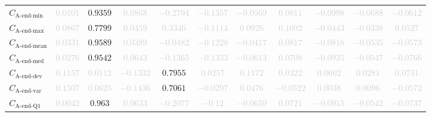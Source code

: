 \documentclass{standalone}
\newcommand{\lastminname}{\text{A-end-min}}
\newcommand{\lastmin}{C_{\lastminname}}
\newcommand{\lastmaxname}{\text{A-end-max}}
\newcommand{\lastmax}{C_{\lastmaxname}}
\newcommand{\lastmeanname}{\text{A-end-mean}}
\newcommand{\lastmean}{C_{\lastmeanname}}
\newcommand{\lastmedianname}{\text{A-end-med}}
\newcommand{\lastmedian}{C_{\lastmedianname}}
\newcommand{\lastdevname}{\text{A-end-dev}}
\newcommand{\lastdev}{C_{\lastdevname}}
\newcommand{\lastvarname}{\text{A-end-var}}
\newcommand{\lastvar}{C_{\lastvarname}}
\newcommand{\lastqonename}{\text{A-end-Q1}}
\newcommand{\lastqone}{C_{\lastqonename}}
\begin{document}
\begin{tabular}{lcccccccccc}
$\lastmin$ & \textcolor{lightgray}{$0.0101$} & $0.9359$ & \textcolor{lightgray}{$0.0868$} & \textcolor{lightgray}{$-0.2794$} & \textcolor{lightgray}{$-0.1357$} & \textcolor{lightgray}{$-0.0569$} & \textcolor{lightgray}{$0.0811$} & \textcolor{lightgray}{$-0.0998$} & \textcolor{lightgray}{$-0.0688$} & \textcolor{lightgray}{$-0.0612$} \\ 
$\lastmax$ & \textcolor{lightgray}{$0.0867$} & $0.7799$ & \textcolor{lightgray}{$0.0459$} & \textcolor{lightgray}{$0.3346$} & \textcolor{lightgray}{$-0.1114$} & \textcolor{lightgray}{$0.0926$} & \textcolor{lightgray}{$0.1092$} & \textcolor{lightgray}{$-0.0443$} & \textcolor{lightgray}{$-0.0338$} & \textcolor{lightgray}{$0.0527$} \\ 
$\lastmean$ & \textcolor{lightgray}{$0.0331$} & $0.9589$ & \textcolor{lightgray}{$0.0389$} & \textcolor{lightgray}{$-0.0482$} & \textcolor{lightgray}{$-0.1228$} & \textcolor{lightgray}{$-0.0417$} & \textcolor{lightgray}{$0.0817$} & \textcolor{lightgray}{$-0.0816$} & \textcolor{lightgray}{$-0.0535$} & \textcolor{lightgray}{$-0.0573$} \\ 
$\lastmedian$ & \textcolor{lightgray}{$0.0276$} & $0.9542$ & \textcolor{lightgray}{$0.0643$} & \textcolor{lightgray}{$-0.1365$} & \textcolor{lightgray}{$-0.1333$} & \textcolor{lightgray}{$-0.0613$} & \textcolor{lightgray}{$0.0708$} & \textcolor{lightgray}{$-0.0935$} & \textcolor{lightgray}{$-0.0547$} & \textcolor{lightgray}{$-0.0766$} \\ 
$\lastdev$ & \textcolor{lightgray}{$0.1157$} & \textcolor{lightgray}{$0.0112$} & \textcolor{lightgray}{$-0.1332$} & $0.7955$ & \textcolor{lightgray}{$0.0257$} & \textcolor{lightgray}{$0.1172$} & \textcolor{lightgray}{$0.0322$} & \textcolor{lightgray}{$0.0602$} & \textcolor{lightgray}{$0.0281$} & \textcolor{lightgray}{$0.0731$} \\ 
$\lastvar$ & \textcolor{lightgray}{$0.1507$} & \textcolor{lightgray}{$0.0625$} & \textcolor{lightgray}{$-0.1436$} & $0.7061$ & \textcolor{lightgray}{$-0.0297$} & \textcolor{lightgray}{$0.0476$} & \textcolor{lightgray}{$-0.0522$} & \textcolor{lightgray}{$0.0038$} & \textcolor{lightgray}{$0.0096$} & \textcolor{lightgray}{$-0.0572$} \\ 
$\lastqone$ & \textcolor{lightgray}{$0.0042$} & $0.963$ & \textcolor{lightgray}{$0.0633$} & \textcolor{lightgray}{$-0.2077$} & \textcolor{lightgray}{$-0.12$} & \textcolor{lightgray}{$-0.0659$} & \textcolor{lightgray}{$0.0721$} & \textcolor{lightgray}{$-0.0915$} & \textcolor{lightgray}{$-0.0542$} & \textcolor{lightgray}{$-0.0737$} \\ 

\end{tabular}
\end{document}
